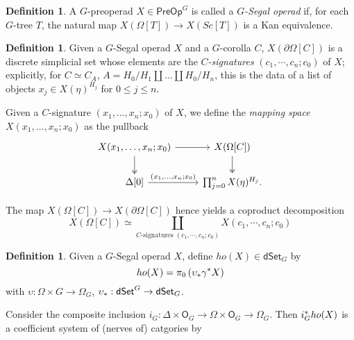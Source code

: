\documentclass[a4paper,10pt
,draft
]{article}%
\numberwithin{equation}{section}
\numberwithin{figure}{section}
\theoremstyle{definition} %
\newtheorem{definition}[equation]{Definition}%
\newcommand{\dSet}{\mathsf{dSet}}
\newcommand{\1}{\ensuremath{\mathbbm 1}}%
\begin{document}
\begin{definition}
	A $G$-preoperad $X \in \mathsf{PreOp}^G$ is called a \textit{$G$-Segal operad} if, 
	for each $G$-tree $T$,
	the natural map 
	$X\left( \Omega[T] \right) \to 
	X \left( Sc[T] \right)$
	is a Kan equivalence.
\end{definition}

\begin{definition}%
      Given a $G$-Segal operad $X$ and a $G$-corolla $C$,
      $X(\partial \Omega[C])$ is a discrete simplicial set whose elements
      are the \textit{$C$-signatures} $(c_1,\cdots,c_n;c_0)$ of $X$;
      explicitly, for $C \simeq C_A$, $A = H_0/H_1 \amalg \dots \amalg H_0/H_n$, this is the data of
      a list of objects $x_j \in X(\eta)^{H_j}$ for $0 \leq j \leq n$.

      Given a $C$-signature $(x_1, \dots, x_n; x_0)$ of $X$, we define the \textit{mapping space} $X(x_1,\dots,x_n; x_0)$ as the pullback
      \[
            \begin{tikzcd}
                  X(x_1, \dots, x_n; x_0) \arrow[r] \arrow[d, twoheadrightarrow]
                  &
                  X(\Omega[C]) \arrow[d, twoheadrightarrow]
                  \\
                  \Delta[0] \arrow[r, "{(x_1, \dots, x_n;x_0)}"]
                  &
                  \prod_{j = 0}^n X(\eta)^{H_j}.
            \end{tikzcd}
      \]

      The map $X(\Omega[C]) \to X(\partial \Omega[C])$ hence yields
      a coproduct decomposition 
      \[
            X(\Omega[C]) \simeq \coprod_{C\text{-signatures }(c_1,\cdots,c_n;c_0)}
            X(c_1,\cdots,c_n;c_0)
      \]    
\end{definition}

\begin{definition}
      Given a $G$-Segal operad $X$, define $ho(X) \in \dSet_G$ by
      \[
            ho(X) = \pi_0\left(\upsilon_{\**}\gamma^{\**}X\right)
      \]
      with $\upsilon: \Omega \times G \to \Omega_G$, $\upsilon_{\**}: \dSet^G \to \dSet_G$.

      Consider the composite inclusion $i_G: \Delta \times \mathsf O_G \to \Omega \times \mathsf O_G \to \Omega_G$.
      Then $i_G^{\**}ho(X)$ is a coefficient system of (nerves of) catgories by \cite[Prop. 5.9, Remark 5.11]{BP_edss}
\end{definition}
\end{document}
